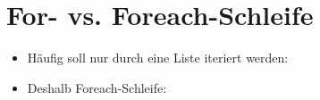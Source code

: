 



\subtitle{Kapitel 5: ganz viele variablen in einer}
\titlegraphic{
	\begin{columns}
		\begin{column}{10cm}
			\vspace{1.5cm}
			\begin{center}
				{\huge Foreach-Schleifen}
			\end{center}
		\end{column}
	\end{columns}}
\subtitle{Listen}
\maketitle

\section{For- vs. Foreach-Schleife}
\begin{frame}
	\slidehead

	\begin{itemize}
		\item Häufig soll nur durch eine Liste iteriert werden:
		\pause

		\item Deshalb Foreach-Schleife:
	\end{itemize}
\end{frame}



